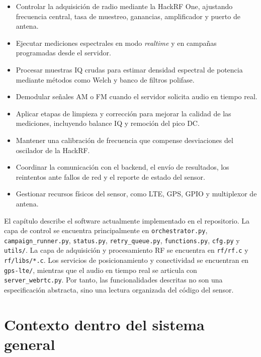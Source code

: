 \begin{itemize}
  \item Controlar la adquisición de radio mediante la HackRF One, ajustando
  frecuencia central, tasa de muestreo, ganancias, amplificador y puerto de
  antena.

  \item Ejecutar mediciones espectrales en modo \textit{realtime} y en campañas
  programadas desde el servidor.

  \item Procesar muestras IQ crudas para estimar densidad espectral de potencia
  mediante métodos como Welch y banco de filtros polifase.

  \item Demodular señales AM o FM cuando el servidor solicita audio en tiempo
  real.

  \item Aplicar etapas de limpieza y corrección para mejorar la calidad de las
  mediciones, incluyendo balance IQ y remoción del pico DC.

  \item Mantener una calibración de frecuencia que compense desviaciones del
  oscilador de la HackRF.

  \item Coordinar la comunicación con el backend, el envío de resultados, los
  reintentos ante fallos de red y el reporte de estado del sensor.

  \item Gestionar recursos físicos del sensor, como LTE, GPS, GPIO y multiplexor
  de antena.
\end{itemize}

El capítulo describe el software actualmente implementado en el repositorio. La
capa de control se encuentra principalmente en \texttt{orchestrator.py},
\texttt{campaign\_runner.py}, \texttt{status.py}, \texttt{retry\_queue.py},
\texttt{functions.py}, \texttt{cfg.py} y \texttt{utils/}. La capa de adquisición y
procesamiento RF se encuentra en \texttt{rf/rf.c} y \texttt{rf/libs/*.c}. Los
servicios de posicionamiento y conectividad se encuentran en \texttt{gps-lte/},
mientras que el audio en tiempo real se articula con \texttt{server\_webrtc.py}.
Por tanto, las funcionalidades descritas no son una especificación abstracta, sino
una lectura organizada del código del sensor.


\section{Contexto dentro del sistema general}


